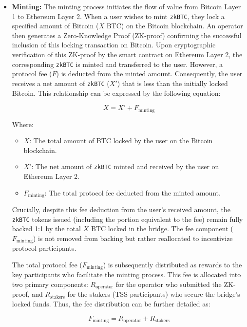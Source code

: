 \documentclass{DESSThesis}
\newcommand{\zktoken}{\texttt{zkBTC}}
\begin{document}
\begin{itemize}
    \item \textbf{Minting:} The minting process initiates the flow of value from Bitcoin Layer 1 to Ethereum Layer 2. When a user wishes to mint \texttt{\zktoken}, they lock a specified amount of Bitcoin (\(X\) BTC) on the Bitcoin blockchain. An operator then generates a Zero-Knowledge Proof (ZK-proof) confirming the successful inclusion of this locking transaction on Bitcoin. Upon cryptographic verification of this ZK-proof by the smart contract on Ethereum Layer 2, the corresponding \texttt{\zktoken} is minted and transferred to the user. However, a protocol fee (\(F\)) is deducted from the minted amount. Consequently, the user receives a net amount of \texttt{\zktoken} (\(X'\)) that is less than the initially locked Bitcoin. This relationship can be expressed by the following equation:

\begin{equation} \label{eq:minting_overall}
    X = X' + F_{\text{minting}}
\end{equation}

    Where:
    \begin{itemize}
        \item \(X\): The total amount of BTC locked by the user on the Bitcoin blockchain.
        \item \(X'\): The net amount of \texttt{\zktoken} minted and received by the user on Ethereum Layer 2.
        \item \(F_{\text{minting}}\): The total protocol fee deducted from the minted amount.
    \end{itemize}
    Crucially, despite this fee deduction from the user's received amount, the \texttt{\zktoken} tokens issued (including the portion equivalent to the fee) remain fully backed 1:1 by the total \(X\) BTC locked in the bridge. The fee component (\(F_{\text{minting}}\)) is not removed from backing but rather reallocated to incentivize protocol participants.

    The total protocol fee (\(F_{\text{minting}}\)) is subsequently distributed as rewards to the key participants who facilitate the minting process. This fee is allocated into two primary components: \(R_{\text{operator}}\) for the operator who submitted the ZK-proof, and \(R_{\text{stakers}}\) for the stakers (TSS participants) who secure the bridge's locked funds. Thus, the fee distribution can be further detailed as:

\begin{equation} \label{eq:minting_reward}
    F_{\text{minting}} = R_{\text{operator}} + R_{\text{stakers}}
\end{equation}


\end{itemize}
\end{document}

